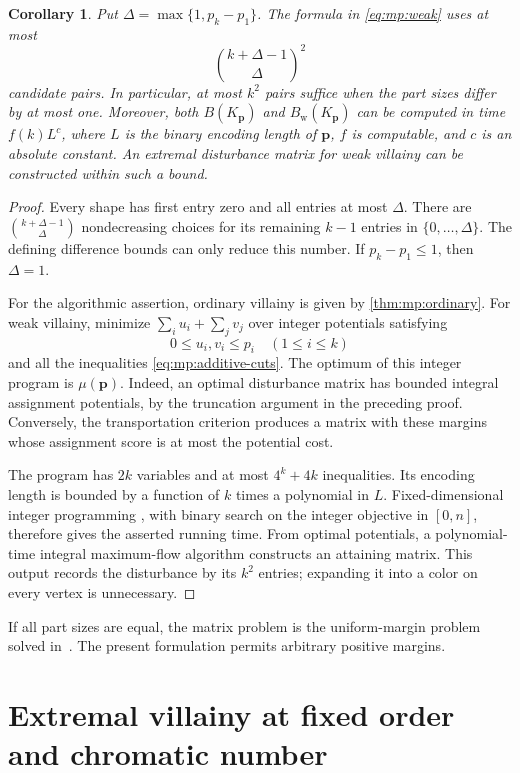 \documentclass[11pt,reqno]{amsart}
\numberwithin{equation}{section}
\newtheorem{corollary}[theorem]{Corollary}
\theoremstyle{definition}
\theoremstyle{remark}
\begin{document}
\begin{corollary}\label{cor:mp:computation}
Put $\Delta=\max\{1,p_k-p_1\}$. The formula in
\eqref{eq:mp:weak} uses at most
\[
 \binom{k+\Delta-1}{\Delta}^{\!2}
\]
candidate pairs. In particular, at most $k^2$ pairs suffice when the
part sizes differ by at most one.
Moreover, both $B(K_{\mathbf p})$ and $B_{\mathrm w}(K_{\mathbf p})$
can be computed in time $f(k)L^c$, where $L$ is the binary encoding
length of $\mathbf p$, $f$ is computable, and $c$ is an absolute constant.
An extremal disturbance matrix for weak villainy can be constructed
within such a bound.
\end{corollary}
\begin{proof}
Every shape has first entry zero and all entries at most $\Delta$.
There are $\binom{k+\Delta-1}{\Delta}$ nondecreasing choices for its
remaining $k-1$ entries in $\{0,\ldots,\Delta\}$. The defining
difference bounds can only reduce this number. If $p_k-p_1\le1$,
then $\Delta=1$.

For the algorithmic assertion, ordinary villainy is given by
\cref{thm:mp:ordinary}. For weak villainy, minimize
$\sum_i u_i+\sum_jv_j$ over integer potentials satisfying
\[
 0\le u_i,v_i\le p_i\quad(1\le i\le k)
\]
and all the inequalities \eqref{eq:mp:additive-cuts}.
The optimum of this integer program is $\mu(\mathbf p)$.
Indeed, an optimal disturbance matrix has bounded integral assignment
potentials, by the truncation argument in the preceding proof.
Conversely, the transportation criterion produces a matrix with these
margins whose assignment score is at most the potential cost.

The program has $2k$ variables and at most $4^k+4k$ inequalities.
Its encoding length is bounded by a function of $k$ times a polynomial
in $L$. Fixed-dimensional integer programming
\cite{lenstra1983,kannan1983}, with binary search on the integer
objective in $[0,n]$, therefore gives the asserted running time.
From optimal potentials, a polynomial-time integral maximum-flow
algorithm constructs an attaining matrix. This output records the
disturbance by its $k^2$ entries; expanding it into a color on every
vertex is unnecessary.
\end{proof}

If all part sizes are equal, the matrix problem is the uniform-margin
problem solved in~\cite{dinitz2012,gajula2015}. The present formulation
permits arbitrary positive margins.

\section{Extremal villainy at fixed order and chromatic number}
\label{sec:extremal}
\end{document}
